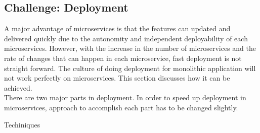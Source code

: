 \subsection{Challenge: Deployment}\label{section:challanges_of_microservices_architecture/deployment}
A major advantage of microservices is that the features can updated and delivered quickly due to the autonomity and independent deployability of each microservices. However, with the increase in the number of microservices and the rate of changes that can happen in each microservice, fast deployment is not straight forward. The culture of doing deployment for monolithic application will not work perfectly on microservices. This section discusses how it can be achieved.
\\
There are two major parts in deployment. In order to speed up deployment in microservices, approach to accomplish each part has to be changed slightly.
\begin{shaded}Techiniques\end{shaded}

